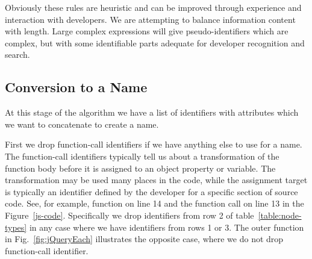 \documentclass[10pt, preprint]{sigplanconf}
\begin{document}
Obviously these rules are heuristic and can be improved through experience and interaction with developers. We are attempting to balance information content with length. Large complex expressions will give pseudo-identifiers which are complex, but with some identifiable parts adequate for developer recognition and search.

\begin{table}
\centering
{}
\caption{JavaScript Expression Reduction to a Name. Expressions which match an entry in the pattern column are converted as shown in the Name column. Here \texttt{e} indicates an expression, \texttt{id} indicates an identifier, \texttt{+} means string concatenation and \texttt{Name()} means we apply the pattern matching recursively.}
\label{expression-reduction} 
\end{table}    

\subsection{Conversion to a Name}
\label{sec:concatenation}
At this stage of the algorithm we have a list of identifiers with attributes which we want to concatenate to create a name. 

First we drop function-call identifiers if we have anything else to use for a name. The function-call identifiers typically tell us about a transformation of the function body before it is assigned to an object property or variable. The transformation may be used many places in the code, while the assignment target is typically an identifier defined by the developer for a specific section of source code.  See, for example, function on line 14 and the function call on line 13 in the Figure~\ref{js-code}. Specifically we drop identifiers from row 2 of table~\ref{table:node-types} in any case where we have identifiers from rows 1 or 3.  The outer function in Fig.~\ref{fig:jQueryEach} illustrates the opposite case, where we do not drop function-call identifier. 
 
\end{document}
